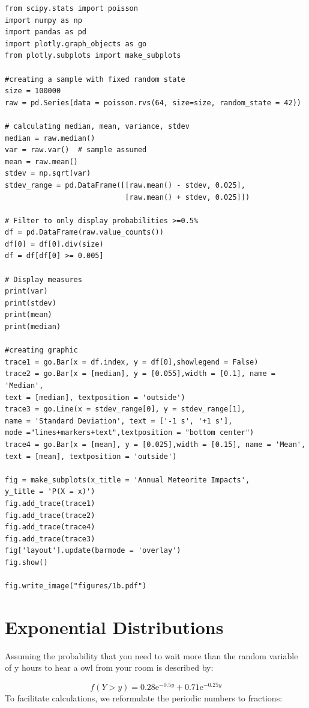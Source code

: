 \begin{lstlisting}
from scipy.stats import poisson
import numpy as np
import pandas as pd
import plotly.graph_objects as go
from plotly.subplots import make_subplots

#creating a sample with fixed random state
size = 100000
raw = pd.Series(data = poisson.rvs(64, size=size, random_state = 42))

# calculating median, mean, variance, stdev
median = raw.median()
var = raw.var()  # sample assumed
mean = raw.mean()
stdev = np.sqrt(var)
stdev_range = pd.DataFrame([[raw.mean() - stdev, 0.025],
                            [raw.mean() + stdev, 0.025]])

# Filter to only display probabilities >=0.5%
df = pd.DataFrame(raw.value_counts())
df[0] = df[0].div(size)
df = df[df[0] >= 0.005]

# Display measures
print(var)
print(stdev)
print(mean)
print(median)

#creating graphic
trace1 = go.Bar(x = df.index, y = df[0],showlegend = False)
trace2 = go.Bar(x = [median], y = [0.055],width = [0.1], name = 'Median', 
text = [median], textposition = 'outside')
trace3 = go.Line(x = stdev_range[0], y = stdev_range[1], 
name = 'Standard Deviation', text = ['-1 s', '+1 s'],
mode ="lines+markers+text",textposition = "bottom center")
trace4 = go.Bar(x = [mean], y = [0.025],width = [0.15], name = 'Mean', 
text = [mean], textposition = 'outside')

fig = make_subplots(x_title = 'Annual Meteorite Impacts',
y_title = 'P(X = x)')
fig.add_trace(trace1)
fig.add_trace(trace2)
fig.add_trace(trace4)
fig.add_trace(trace3)
fig['layout'].update(barmode = 'overlay')
fig.show()

fig.write_image("figures/1b.pdf")
\end{lstlisting}

\section{Exponential Distributions}
Assuming the probability that you need to wait more than the random variable of y hours to hear a owl from your room is described by:

\begin{equation}  f(Y > y) = 0.2\overline{8}\mathrm{e}^{-0.5y} + 0.7\overline{1}\mathrm{e}^{-0.25y}
\label{eq:initcdf}
\end{equation}
To facilitate calculations, we reformulate the periodic numbers to fractions:

